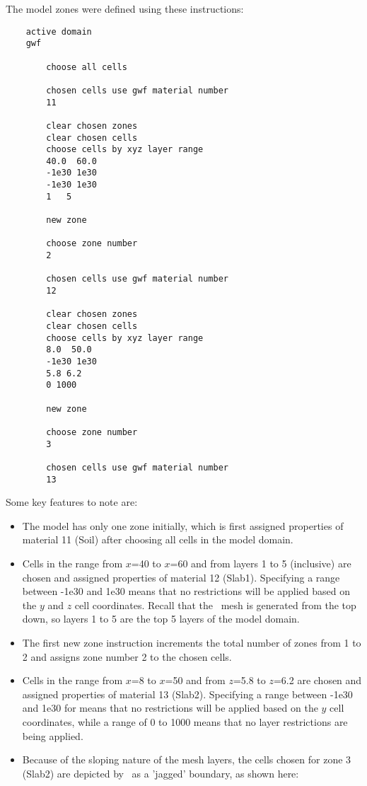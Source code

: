 {\pagebreak
The model zones were defined using these instructions:
\begin{verbatim}
    active domain
    gwf

        choose all cells

        chosen cells use gwf material number
        11

        clear chosen zones
        clear chosen cells
        choose cells by xyz layer range
        40.0  60.0
        -1e30 1e30
        -1e30 1e30
        1   5

        new zone

        choose zone number
        2

        chosen cells use gwf material number
        12

        clear chosen zones
        clear chosen cells
        choose cells by xyz layer range
        8.0  50.0
        -1e30 1e30
        5.8 6.2
        0 1000

        new zone

        choose zone number
        3

        chosen cells use gwf material number
        13
\end{verbatim}


Some key features to note are:
\begin{itemize}
    \item The model has only one zone initially, which is first assigned properties of material 11 (Soil) after choosing all cells in the model domain.
    \item Cells in the range from $x$=40 to $x$=60 and from layers 1 to 5 (inclusive) are chosen and assigned properties of material 12 (Slab1).  Specifying a range between -1e30 and 1e30 means that no restrictions will be applied based on the $y$ and $z$ cell coordinates. Recall that the \mfus\ mesh is generated from the top down, so layers 1 to 5 are the top 5 layers of the model domain.
    \item The first {\sf new zone} instruction increments the total number of zones from 1 to 2 and assigns zone number 2 to the chosen cells.
    \item Cells in the range from $x$=8 to $x$=50 and from $z$=5.8 to $z$=6.2 are chosen and assigned properties of material 13 (Slab2).  Specifying a range between -1e30 and 1e30 for means that no restrictions will be applied based on the $y$ cell coordinates, while a range of 0 to 1000 means that no layer restrictions are being applied.
    \item Because of the sloping nature of the mesh layers, the cells chosen for zone 3 (Slab2) are depicted by \tecplot\ as a 'jagged' boundary, as shown here:


\end{itemize}}
